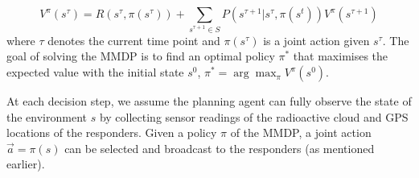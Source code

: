 \begin{equation}
  V^\pi(s^\tau) = R(s^\tau, \pi(s^\tau)) + \!\!\!\sum_{s^{\tau+1}\in S}\!\!\!
  P(s^{\tau+1}|s^\tau, \pi(s^t)) V^\pi(s^{\tau+1})
\end{equation}
where $\tau$ denotes the current time point and $\pi(s^\tau)$ is a joint action given $s^\tau$. The goal of solving
the MMDP is to find an optimal policy $\pi^*$ that maximises the
expected value with the initial state $s^0$, $\pi^* =
\arg\max_{\pi} V^\pi(s^0)$.

At each decision step, we assume the planning agent can fully
observe the state of the environment $s$ by collecting sensor
readings of the radioactive cloud and GPS locations of the
responders. Given a policy $\pi$ of the MMDP, a joint action
$\vec{a}=\pi(s)$ can be selected and broadcast to the responders
(as mentioned earlier).
